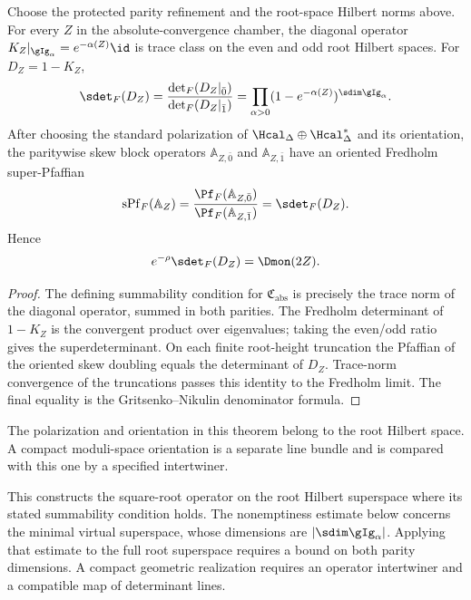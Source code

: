 \begin{theorem}
Choose the protected parity refinement and the root-space Hilbert norms above.  For every $Z$ in the absolute-convergence chamber, the diagonal operator $K_Z|_{\gIg_\alpha}=e^{-\alpha(Z)}\id$ is trace class on the even and odd root Hilbert spaces.  For $D_Z=1-K_Z$,
\[
 \sdet_F(D_Z)
 =\frac{\det_F(D_Z|_{\bar0})}{\det_F(D_Z|_{\bar1})}
 =\prod_{\alpha>0}(1-e^{-\alpha(Z)})^{\sdim\gIg_\alpha}.
\]
After choosing the standard polarization of $\Hcal_\Delta\oplus\Hcal_\Delta^*$ and its orientation, the paritywise skew block operators $\mathbb A_{Z,\bar0}$ and $\mathbb A_{Z,\bar1}$ have an oriented Fredholm super-Pfaffian
\[
 \operatorname{sPf}_F(\mathbb A_Z)=\frac{\Pf_F(\mathbb A_{Z,\bar0})}{\Pf_F(\mathbb A_{Z,\bar1})}
 =\sdet_F(D_Z).
\]  Hence
\[
 e^{-\rho}\sdet_F(D_Z)=\Dmon(2Z).
\]
\end{theorem}
\begin{proof}
The defining summability condition for \(\mathfrak C_{\mathrm{abs}}\)
is precisely the trace norm of the diagonal operator, summed in both
parities.  The Fredholm determinant of $1-K_Z$ is the convergent product over eigenvalues; taking the even/odd ratio gives the superdeterminant.  On each finite root-height truncation the Pfaffian of the oriented skew doubling equals the determinant of $D_Z$.  Trace-norm convergence of the truncations passes this identity to the Fredholm limit.  The final equality is the Gritsenko--Nikulin denominator formula.
\end{proof}

\begin{remark}
The polarization and orientation in this theorem belong to the root Hilbert space.  A compact moduli-space orientation is a separate line bundle and is compared with this one by a specified intertwiner.
\end{remark}

This constructs the square-root operator on the root Hilbert superspace
where its stated summability condition holds. The nonemptiness estimate
below concerns the minimal virtual superspace, whose dimensions are
\(\lvert\sdim\gIg_\alpha\rvert\). Applying that estimate to the
full root superspace requires a bound on both parity dimensions.
A compact geometric realization requires an operator intertwiner and
a compatible map of determinant lines.

